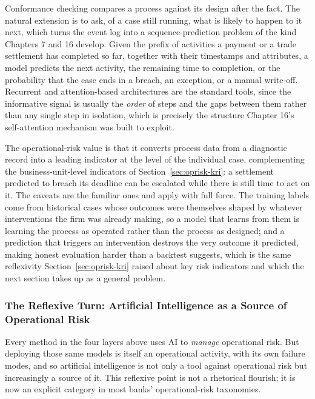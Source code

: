 \documentclass[../ai_in_finance]{subfiles}
\begin{document}
Conformance checking compares a process against its design after the fact. The natural extension is to ask, of a case still running, what is likely to happen to it next, which turns the event log into a sequence-prediction problem of the kind Chapters 7 and 16 develop. Given the prefix of activities a payment or a trade settlement has completed so far, together with their timestamps and attributes, a model predicts the next activity, the remaining time to completion, or the probability that the case ends in a breach, an exception, or a manual write-off. Recurrent and attention-based architectures are the standard tools, since the informative signal is usually the \emph{order} of steps and the gaps between them rather than any single step in isolation, which is precisely the structure Chapter 16's self-attention mechanism was built to exploit.

The operational-risk value is that it converts process data from a diagnostic record into a leading indicator at the level of the individual case, complementing the business-unit-level indicators of Section~\ref{sec:oprisk-kri}: a settlement predicted to breach its deadline can be escalated while there is still time to act on it. The caveats are the familiar ones and apply with full force. The training labels come from historical cases whose outcomes were themselves shaped by whatever interventions the firm was already making, so a model that learns from them is learning the process as operated rather than the process as designed; and a prediction that triggers an intervention destroys the very outcome it predicted, making honest evaluation harder than a backtest suggests, which is the same reflexivity Section~\ref{sec:oprisk-kri} raised about key risk indicators and which the next section takes up as a general problem.

\subsubsection*{The Reflexive Turn: Artificial Intelligence as a Source of Operational Risk}
\label{sec:oprisk-reflexive}

Every method in the four layers above uses AI to \emph{manage} operational risk. But deploying those same models is itself an operational activity, with its own failure modes, and so artificial intelligence is not only a tool against operational risk but increasingly a source of it. This reflexive point is not a rhetorical flourish; it is now an explicit category in most banks' operational-risk taxonomies.
\end{document}
